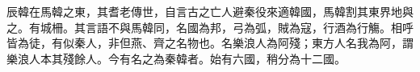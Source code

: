 
\begin{pinyinscope}
辰韓在馬韓之東，其耆老傳世，自言古之亡人避秦役來適韓國，馬韓割其東界地與之。有城柵。其言語不與馬韓同，名國為邦，弓為弧，賊為寇，行酒為行觴。相呼皆為徒，有似秦人，非但燕、齊之名物也。名樂浪人為阿殘；東方人名我為阿，謂樂浪人本其殘餘人。今有名之為秦韓者。始有六國，稍分為十二國。


\end{pinyinscope}